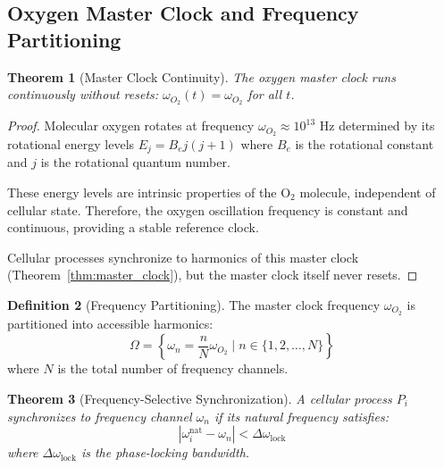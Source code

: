 \documentclass[11pt,twocolumn,a4paper]{article}
\newtheorem{theorem}{Theorem}[section]
\theoremstyle{definition}
\newtheorem{definition}[theorem]{Definition}
\theoremstyle{remark}
\newcommand{\omegalock}{\Delta\omega_{\mathrm{lock}}}
\begin{document}
\subsection{Oxygen Master Clock and Frequency Partitioning}

\begin{theorem}[Master Clock Continuity]
\label{thm:master_clock_continuity}
The oxygen master clock runs continuously without resets: $\omega_{O_2}(t) = \omega_{O_2}$ for all $t$.
\end{theorem}

\begin{proof}
Molecular oxygen rotates at frequency $\omega_{O_2} \approx 10^{13}$ Hz determined by its rotational energy levels $E_j = B_e j(j+1)$ where $B_e$ is the rotational constant and $j$ is the rotational quantum number.

These energy levels are intrinsic properties of the O$_2$ molecule, independent of cellular state. Therefore, the oxygen oscillation frequency is constant and continuous, providing a stable reference clock.

Cellular processes synchronize to harmonics of this master clock (Theorem~\ref{thm:master_clock}), but the master clock itself never resets.
\end{proof}

\begin{definition}[Frequency Partitioning]
\label{def:frequency_partitioning}
The master clock frequency $\omega_{O_2}$ is partitioned into accessible harmonics:
\begin{equation}
\Omega = \left\{\omega_n = \frac{n}{N}\omega_{O_2} \mid n \in \{1,2,\ldots,N\}\right\}
\label{eq:frequency_partition}
\end{equation}
where $N$ is the total number of frequency channels.
\end{definition}

\begin{theorem}[Frequency-Selective Synchronization]
\label{thm:frequency_synchronization}
A cellular process $P_i$ synchronizes to frequency channel $\omega_n$ if its natural frequency satisfies:
\begin{equation}
|\omega_i^{\mathrm{nat}} - \omega_n| < \omegalock
\label{eq:synchronization_condition}
\end{equation}
where $\omegalock$ is the phase-locking bandwidth.
\end{theorem}
\end{document}
